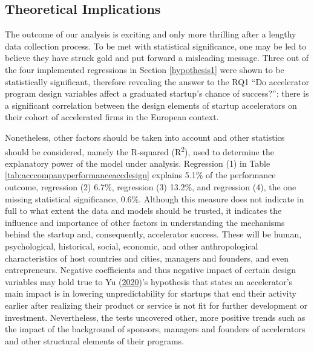 \documentclass[
  12pt,
]{article}
\begin{document}
\hypertarget{theoretical-implications}{%
\subsection{Theoretical Implications}\label{theoretical-implications}}

The outcome of our analysis is exciting and only more thrilling after a lengthy data collection process. To be met with statistical significance, one may be led to believe they have struck gold and put forward a misleading message. Three out of the four implemented regressions in Section \ref{hypothesis1} were shown to be statistically significant, therefore revealing the answer to the RQ1 ``Do accelerator program design variables affect a graduated startup's chance of success?'': there is a significant correlation between the design elements of startup accelerators on their cohort of accelerated firms in the European context.

Nonetheless, other factors should be taken into account and other statistics should be considered, namely the R-squared (R\textsuperscript{2}), used to determine the explanatory power of the model under analysis. Regression (1) in Table \ref{tab:acccompanyperformanceaccdesign} explains 5.1\% of the performance outcome, regression (2) 6.7\%, regression (3) 13.2\%, and regression (4), the one missing statistical significance, 0.6\%. Although this measure does not indicate in full to what extent the data and models should be trusted, it indicates the influence and importance of other factors in understanding the mechanisms behind the startup and, consequently, accelerator success. These will be human, psychological, historical, social, economic, and other anthropological characteristics of host countries and cities, managers and founders, and even entrepreneurs. Negative coefficients and thus negative impact of certain design variables may hold true to Yu (\protect\hyperlink{ref-yu_accelerators_2020}{2020})'s hypothesis that states an accelerator's main impact is in lowering unpredictability for startups that end their activity earlier after realizing their product or service is not fit for further development or investment. Nevertheless, the tests uncovered other, more positive trends such as the impact of the background of sponsors, managers and founders of accelerators and other structural elements of their programs.
\end{document}
